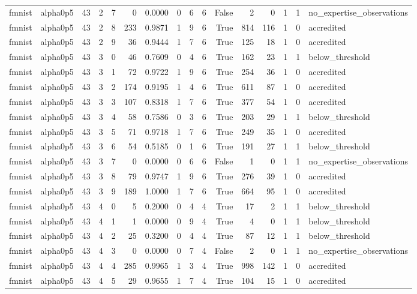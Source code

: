 \begin{tabular}{llrrrrrrrrrrrrrl}
fmnist & alpha0p5 & 43 & 2 & 7 & 0 & 0.0000 & 0 & 6 & 6 & False & 2 & 0 & 1 & 1 & no\_expertise\_observations \\
fmnist & alpha0p5 & 43 & 2 & 8 & 233 & 0.9871 & 1 & 9 & 6 & True & 814 & 116 & 1 & 0 & accredited \\
fmnist & alpha0p5 & 43 & 2 & 9 & 36 & 0.9444 & 1 & 7 & 6 & True & 125 & 18 & 1 & 0 & accredited \\
fmnist & alpha0p5 & 43 & 3 & 0 & 46 & 0.7609 & 0 & 4 & 6 & True & 162 & 23 & 1 & 1 & below\_threshold \\
fmnist & alpha0p5 & 43 & 3 & 1 & 72 & 0.9722 & 1 & 9 & 6 & True & 254 & 36 & 1 & 0 & accredited \\
fmnist & alpha0p5 & 43 & 3 & 2 & 174 & 0.9195 & 1 & 4 & 6 & True & 611 & 87 & 1 & 0 & accredited \\
fmnist & alpha0p5 & 43 & 3 & 3 & 107 & 0.8318 & 1 & 7 & 6 & True & 377 & 54 & 1 & 0 & accredited \\
fmnist & alpha0p5 & 43 & 3 & 4 & 58 & 0.7586 & 0 & 3 & 6 & True & 203 & 29 & 1 & 1 & below\_threshold \\
fmnist & alpha0p5 & 43 & 3 & 5 & 71 & 0.9718 & 1 & 7 & 6 & True & 249 & 35 & 1 & 0 & accredited \\
fmnist & alpha0p5 & 43 & 3 & 6 & 54 & 0.5185 & 0 & 1 & 6 & True & 191 & 27 & 1 & 1 & below\_threshold \\
fmnist & alpha0p5 & 43 & 3 & 7 & 0 & 0.0000 & 0 & 6 & 6 & False & 1 & 0 & 1 & 1 & no\_expertise\_observations \\
fmnist & alpha0p5 & 43 & 3 & 8 & 79 & 0.9747 & 1 & 9 & 6 & True & 276 & 39 & 1 & 0 & accredited \\
fmnist & alpha0p5 & 43 & 3 & 9 & 189 & 1.0000 & 1 & 7 & 6 & True & 664 & 95 & 1 & 0 & accredited \\
fmnist & alpha0p5 & 43 & 4 & 0 & 5 & 0.2000 & 0 & 4 & 4 & True & 17 & 2 & 1 & 1 & below\_threshold \\
fmnist & alpha0p5 & 43 & 4 & 1 & 1 & 0.0000 & 0 & 9 & 4 & True & 4 & 0 & 1 & 1 & below\_threshold \\
fmnist & alpha0p5 & 43 & 4 & 2 & 25 & 0.3200 & 0 & 4 & 4 & True & 87 & 12 & 1 & 1 & below\_threshold \\
fmnist & alpha0p5 & 43 & 4 & 3 & 0 & 0.0000 & 0 & 7 & 4 & False & 2 & 0 & 1 & 1 & no\_expertise\_observations \\
fmnist & alpha0p5 & 43 & 4 & 4 & 285 & 0.9965 & 1 & 3 & 4 & True & 998 & 142 & 1 & 0 & accredited \\
fmnist & alpha0p5 & 43 & 4 & 5 & 29 & 0.9655 & 1 & 7 & 4 & True & 104 & 15 & 1 & 0 & accredited \\

\end{tabular}
